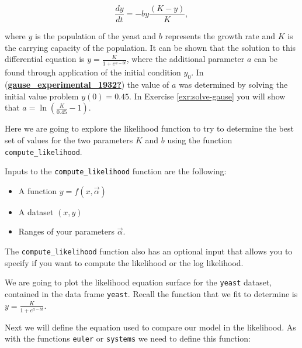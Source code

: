 \documentclass[
]{book}
\providecommand{\tightlist}{%
  \setlength{\itemsep}{0pt}\setlength{\parskip}{0pt}}
\theoremstyle{definition}
\theoremstyle{definition}
\theoremstyle{definition}
\theoremstyle{remark}
\begin{document}
\begin{equation}
\frac{dy}{dt} = -by \frac{(K-y)}{K},
\end{equation}

where \(y\) is the population of the yeast and \(b\) represents the growth rate and \(K\) is the carrying capacity of the population. It can be shown that the solution to this differential equation is \(\displaystyle y = \frac{K}{1+e^{a-bt}}\), where the additional parameter \(a\) can be found through application of the initial condition \(y_{0}\). In (\protect\hyperlink{ref-gause_experimental_1932}{\textbf{gause\_experimental\_1932?}}) the value of \(a\) was determined by solving the initial value problem \(y(0)=0.45\). In Exercise \ref{exr:solve-gause} you will show that \(\displaystyle a = \ln \left( \frac{K}{0.45} - 1 \right)\).

Here we are going to explore the likelihood function to try to determine the best set of values for the two parameters \(K\) and \(b\) using the function \texttt{compute\_likelihood}.

Inputs to the \texttt{compute\_likelihood} function are the following:

\begin{itemize}
\tightlist
\item
  A function \(y=f(x,\vec{\alpha})\)
\item
  A dataset \((x,y)\)
\item
  Ranges of your parameters \(\vec{\alpha}\).
\end{itemize}

The \texttt{compute\_likelihood} function also has an optional input that allows you to specify if you want to compute the likelihood or the log likelihood.

We are going to plot the likelihood equation surface for the \texttt{yeast} dataset, contained in the data frame \texttt{yeast}. Recall the function that we fit to determine is \(\displaystyle y = \frac{K}{1+e^{a-bt}}\).

Next we will define the equation used to compare our model in the likelihood. As with the functions \texttt{euler} or \texttt{systems} we need to define this function:
\end{document}
